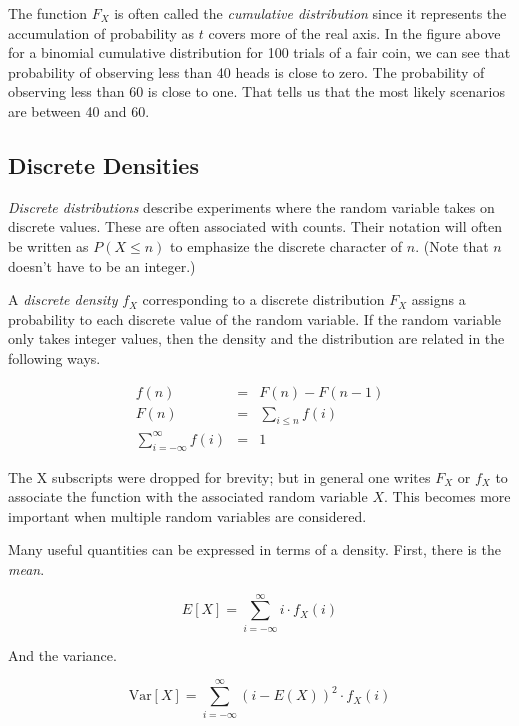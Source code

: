 \documentclass[]{article}
\begin{document}
The function $F_X$ is often called the
\emph{cumulative distribution} since it represents the
accumulation of probability as $t$ covers more of the
real axis.  In the figure above for a binomial
cumulative distribution for 100 trials of a fair coin,
we can see that probability of observing less than 40
heads is close to zero.  The probability of observing
less than 60 is close to one.  That tells us that the
most likely scenarios are between 40 and 60.

\subsection{Discrete Densities}

\emph{Discrete distributions} describe experiments where the
random variable takes on discrete values.  These are
often associated with counts.  Their notation will often
be written as $P(X \le n)$ to emphasize the discrete character
of $n$. (Note that $n$ doesn't have to be an integer.)

A \emph{discrete density} $f_X$ corresponding to a discrete
distribution $F_X$ assigns a probability to each discrete value
of the random variable.  If the random variable only takes
integer values, then the density and the distribution
are related in the following ways.

\begin{eqnarray*}
f(n) & = & F(n) - F(n-1)\\
F(n) & = & \sum_{i \le n} f(i)\\
\sum_{i=-\infty}^{\infty} f(i) & = & 1
\end{eqnarray*}

The X subscripts were dropped for brevity; but in general
one writes $F_X$ or $f_X$ to associate the function with
the associated random variable $X$.  This becomes more
important when multiple random variables are considered.

Many useful quantities can be expressed in terms of a density.
First, there is the \emph{mean}.

\begin{equation} \label{discrete_mean}
E[X] = \sum_{i = -\infty}^{\infty} i \cdot f_X(i)
\end{equation}

And the variance.

\begin{equation} \label{discrete_var1}
\mbox{Var}[X] = \sum_{i = -\infty}^{\infty} (i - E(X))^2 \cdot f_X(i)
\end{equation}
\end{document}

